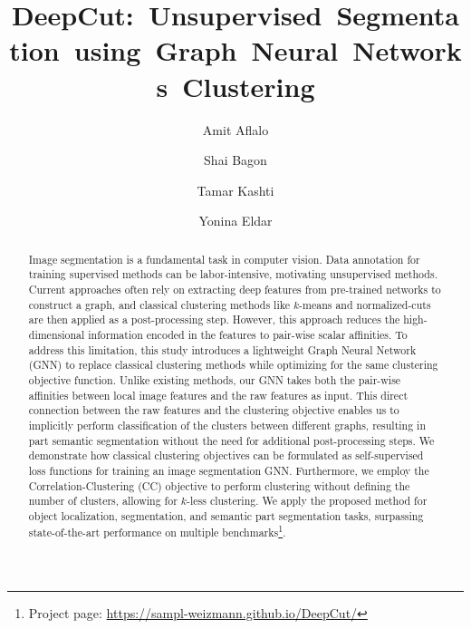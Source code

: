 \documentclass[10pt,twocolumn,letterpaper]{article}
\begin{document}
\title{\mbox{DeepCut: Unsupervised Segmentation using Graph Neural Networks Clustering}}

\author[ ]{Amit Aflalo}
\author[ ]{Shai Bagon}
\author[ ]{Tamar Kashti}
\author[ ]{Yonina Eldar}



\maketitle

\begin{abstract}
Image segmentation is a fundamental task in computer vision.
Data annotation for training supervised methods can be labor-intensive, motivating unsupervised methods.
Current approaches often rely on extracting deep features from pre-trained networks to construct a graph, and classical clustering methods like $k$-means and normalized-cuts are then applied as a post-processing step. However, this approach reduces the high-dimensional information encoded in the features to pair-wise scalar affinities.
To address this limitation, this study introduces a lightweight Graph Neural Network (GNN) to replace classical clustering methods while optimizing for the same clustering objective function. Unlike existing methods, our GNN takes both the pair-wise affinities between local image features and the raw features as input. This direct connection between the raw features and the clustering objective enables us to implicitly perform classification of the clusters between different graphs, resulting in part semantic segmentation without the need for additional post-processing steps.
We demonstrate how classical clustering objectives can be formulated as self-supervised loss functions for training an image segmentation GNN. Furthermore, we employ the Correlation-Clustering (CC) objective to perform clustering without defining the number of clusters, allowing for $k$-less clustering.
We apply the proposed method for object localization, segmentation, and semantic part segmentation tasks, surpassing state-of-the-art performance on multiple benchmarks\footnote{Project page: \href{https://sampl-weizmann.github.io/DeepCut/}{https://sampl-weizmann.github.io/DeepCut/}}.
\end{abstract}
\end{document}
